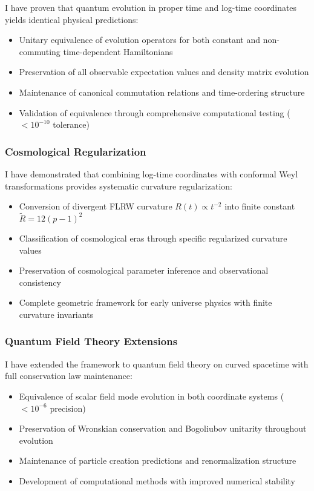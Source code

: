 I have proven that quantum evolution in proper time and log-time coordinates yields identical physical predictions:
\begin{itemize}
\item Unitary equivalence of evolution operators for both constant and non-commuting time-dependent Hamiltonians
\item Preservation of all observable expectation values and density matrix evolution
\item Maintenance of canonical commutation relations and time-ordering structure
\item Validation of equivalence through comprehensive computational testing ($< 10^{-10}$ tolerance)
\end{itemize}

\subsubsection{Cosmological Regularization}

I have demonstrated that combining log-time coordinates with conformal Weyl transformations provides systematic curvature regularization:
\begin{itemize}
\item Conversion of divergent FLRW curvature $R(t) \propto t^{-2}$ into finite constant $\tilde{R} = 12(p-1)^2$
\item Classification of cosmological eras through specific regularized curvature values
\item Preservation of cosmological parameter inference and observational consistency
\item Complete geometric framework for early universe physics with finite curvature invariants
\end{itemize}

\subsubsection{Quantum Field Theory Extensions}

I have extended the framework to quantum field theory on curved spacetime with full conservation law maintenance:
\begin{itemize}
\item Equivalence of scalar field mode evolution in both coordinate systems ($< 10^{-6}$ precision)
\item Preservation of Wronskian conservation and Bogoliubov unitarity throughout evolution
\item Maintenance of particle creation predictions and renormalization structure
\item Development of computational methods with improved numerical stability
\end{itemize}

